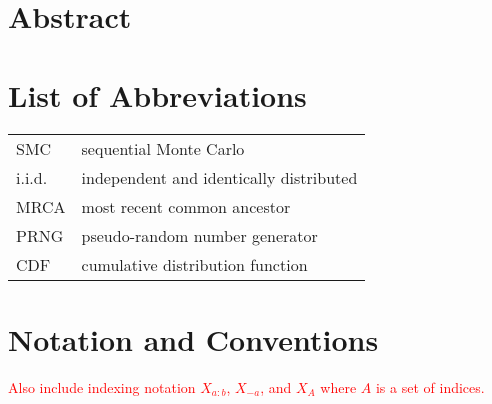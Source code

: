 \documentclass[oneside]{scrbook} %
\newcommand{\seb}[1]{\xspace\textcolor{red}{#1}\xspace} %
\theoremstyle{definition}
\newcommand{\1}[1]{\mathbbm{1}_{#1}} %
\begin{document}
\chapter[Abstract]{Abstract} %



\chapter{List of Abbreviations}
\begin{tabular}{p{} p{}}
SMC & sequential Monte Carlo \\
i.i.d. & independent and identically distributed \\
MRCA & most recent common ancestor \\
PRNG & pseudo-random number generator \\
CDF & cumulative distribution function \\
\end{tabular}


\chapter{Notation and Conventions}
\seb{Also include indexing notation $X_{a:b}$, $X_{-a}$, and $X_A$ where $A$ is a set of indices.}
\end{document}
